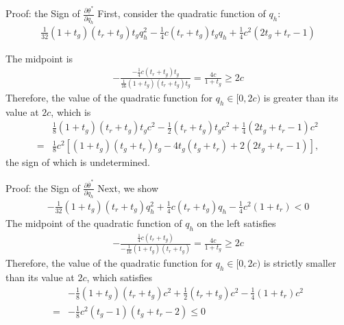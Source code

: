 \documentclass[9pt,aspectratio=1610]{beamer}
\begin{document}
\begin{frame}{Proof: the Sign of $\frac{\partial\underline{\theta}^*}{\partial q_h}$}\label{proof_partial_qh}
First, consider the quadratic function of $q_h$:
\begin{align*}
    \frac{1}{32}(1+t_g)(t_r+t_g)t_gq_h^2 -\frac{1}{4}c(t_r+t_g)t_gq_h + \frac{1}{4}c^2(2t_g+t_r-1)
\end{align*}

The midpoint is
\begin{align*}
    -\frac{-\frac{1}{4}c(t_r+t_g)t_g}{\frac{1}{16}(1+t_g)(t_r+t_g)t_g} = \frac{4c}{1+t_g}\geq 2c
\end{align*}
Therefore, the value of the quadratic function for $q_h\in[0,2c)$ is greater than its value at $2c$, which is
\begin{align*}
    &\frac{1}{8}(1+t_g)(t_r+t_g)t_gc^2 - \frac{1}{2}(t_r+t_g)t_gc^2 + \frac{1}{4}(2t_g+t_r-1)c^2\\
    =& \frac{1}{8}c^2[(1+t_g)(t_g+t_r)t_g - 4t_g(t_g+t_r) + 2(2t_g+t_r-1)],
\end{align*}
the sign of which is undetermined.
\end{frame}


\begin{frame}{Proof: the Sign of $\frac{\partial\overline{\theta}^*}{\partial q_h}$}
Next, we show
\begin{align*}
    -\frac{1}{32}(1+t_g)(t_r+t_g)q_h^2 +\frac{1}{4}c(t_r+t_g)q_h -\frac{1}{4}c^2(1+t_r)<0
\end{align*}
The midpoint of the quadratic function of $q_h$ on the left satisfies
\begin{align*}
    -\frac{\frac{1}{4}c(t_r+t_g)}{-\frac{1}{16}(1+t_g)(t_r+t_g)} = \frac{4c}{1+t_g}\geq 2c
\end{align*}
Therefore, the value of the quadratic function for $q_h\in[0,2c)$ is strictly smaller than its value at $2c$, which satisfies
\begin{align*}
    &-\frac{1}{8}(1+t_g)(t_r+t_g)c^2 + \frac{1}{2}(t_r+t_g)c^2 - \frac{1}{4}(1+t_r)c^2\\
    =& -\frac{1}{8}c^2(t_g-1)(t_g+t_r-2)\leq 0
\end{align*}

\vspace{1em}
\hyperlink{partial_qh}{}
\end{frame}
\end{document}
